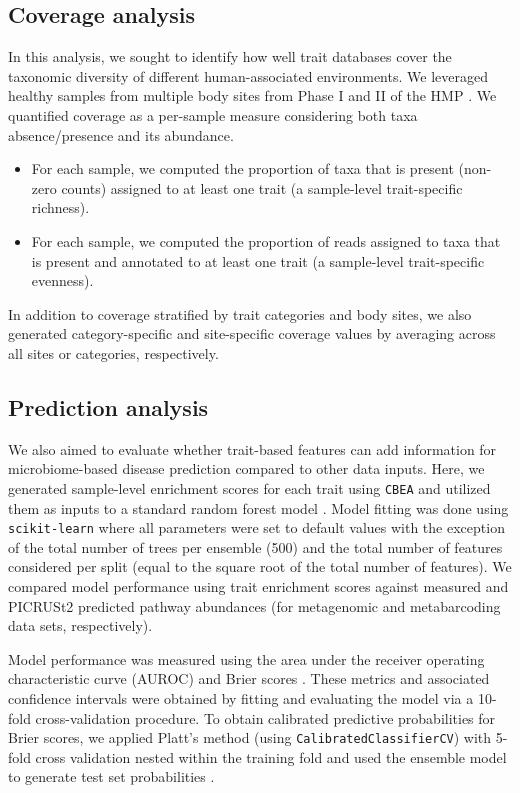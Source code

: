 \documentclass{bmcart}
\begin{document}
\subsection*{Coverage analysis}  

In this analysis, we sought to identify how well trait databases cover the taxonomic diversity of different human-associated environments. We leveraged healthy samples from multiple body sites from Phase I and II of the HMP \cite{consortium2012structure}. We quantified coverage as a per-sample measure considering both taxa absence/presence and its abundance.   
\begin{itemize}
    \item For each sample, we computed the proportion of taxa that is present (non-zero counts) assigned to at least one trait (a sample-level trait-specific richness). 
    \item For each sample, we computed the proportion of reads assigned to taxa that is present and annotated to at least one trait (a sample-level trait-specific evenness).
\end{itemize}

In addition to coverage stratified by trait categories and body sites, we also generated category-specific and site-specific coverage values by averaging across all sites or categories, respectively.

\subsection*{Prediction analysis}  

We also aimed to evaluate whether trait-based features can add information for microbiome-based disease prediction compared to other data inputs. Here, we generated sample-level enrichment scores for each trait using \texttt{CBEA} and utilized them as inputs to a standard random forest model \cite{breiman2001random}. Model fitting was done using \texttt{scikit-learn} \cite{scikit-learn} where all parameters were set to default values with the exception of the total number of trees per ensemble (500) and the total number of features considered per split (equal to the square root of the total number of features). We compared model performance using trait enrichment scores against measured and PICRUSt2 predicted pathway abundances (for metagenomic and metabarcoding data sets, respectively).

Model performance was measured using the area under the receiver operating characteristic curve (AUROC) and Brier scores \cite{brier1950verification}. These metrics and associated confidence intervals were obtained by fitting and evaluating the model via a 10-fold cross-validation procedure. To obtain calibrated predictive probabilities for Brier scores, we applied Platt's method (using \texttt{CalibratedClassifierCV}) with 5-fold cross validation nested within the training fold and used the ensemble model to generate test set probabilities \cite{Platt99probabilisticoutputs}.
\end{document}
